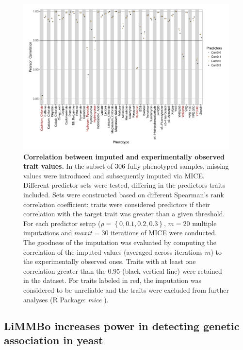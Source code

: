 \begin{figure}[hbtp]
	\centering
	\includegraphics[trim = 0mm 0mm 0mm 0mm, clip, width=01\textwidth]{Chapter1/Figures/20170124_imputation_correlation_median_imputationvalue.pdf}
	\caption[Correlation between imputed and experimentally observed trait values]{\textbf{Correlation between imputed and experimentally observed trait values.} In the subset of 306 fully phenotyped samples, missing values were introduced and subsequently imputed via MICE. Different predictor sets were tested, differing in the predictors traits included. Sets were constructed based on different Spearman's rank correlation coefficient: traits were considered predictors if their correlation with the target trait was greater than a given threshold. For each predictor setup (\(\rho =\left\{0, 0.1, 0.2, 0.3\right\}\),   \(m=20\) multiple imputations and \(maxit=30\) iterations of MICE were conducted. The goodness of the imputation was evaluated by computing the correlation of the imputed values (averaged across iterations \(m\)) to the experimentally observed ones. Traits with at least one correlation greater than the 0.95 (black vertical line) were retained in the dataset. For traits labeled in red, the imputation was considered to be unreliable and the traits were excluded from further analyses (R Package: \emph{mice} \citep{vanBurren2011}).}
 	\label{fig:mice}
\end{figure}



\newpage
 \subsection{LiMMBo increases power in detecting genetic association in yeast}

